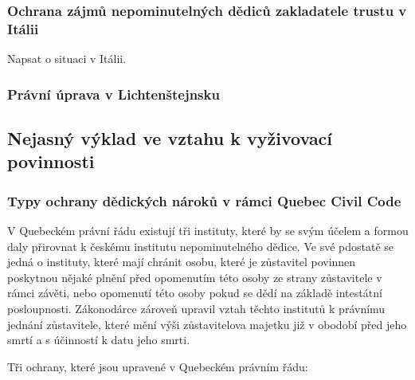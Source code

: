 \documentclass{article}
\begin{document}


\subsubsection{Ochrana zájmů nepominutelných dědiců zakladatele trustu v Itálii}

Napsat o situaci v Itálii.

\subsubsection{Právní úprava v Lichtenštejnsku}

\subsection{Nejasný výklad ve vztahu k vyživovací povinnosti}

\subsubsection{Typy ochrany dědických nároků v rámci Quebec Civil Code}

V Quebeckém právní řádu existují tři instituty, které by se svým účelem a formou daly přirovnat k českému institutu nepominutelného dědice. Ve své pdostatě se jedná o instituty, které mají chránit osobu, které je zůstavitel povinnen poskytnou nějaké plnění před opomenutím této osoby ze strany zůstavitele v rámci závěti, nebo opomenutí této osoby pokud se dědí na základě intestátní posloupnosti. Zákonodárce zároveň upravil vztah těchto institutů k právnímu jednání zůstavitele, které mění výši zůstavitelova majetku již v obodobí před jeho smrtí a s účinností k datu jeho smrti. \\

\vspace{5 mm}

Tři ochrany, které jsou upravené v Quebeckém právním řádu:
\end{document}
